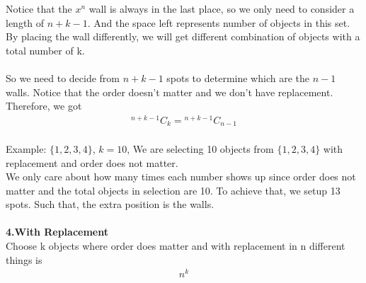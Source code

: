\documentclass[11pt,oneside]{book}
\theoremstyle{break}
\theoremstyle{break}
\newcommand*{\Comb}[2]{{}^{#1}C_{#2}}
\newcommand{\example}{\color{WildStrawberry}Example: \color{black}}
\begin{document}
Notice that the $x^{n}$ wall is always in the last place, so we only need to consider a length of $n+k-1$. And the space left represents number of objects in this set. By placing the wall differently, we will get different combination of objects with a total number of k. \\
\hfill\\
So we need to decide from $n+k-1$ spots to determine which are the $n-1$ walls. Notice that the order doesn't matter and we don't have replacement. Therefore, we got
 \begin{align*}
\Comb{n+k-1}{k}=\Comb{n+k-1}{n-1}
\end{align*}
\hfill\\
\example $\{1,2,3,4\}$, $k=10$, We are selecting 10 objects from $\{1,2,3,4\}$ with replacement and order does not matter.\\
We only care about how many times each number shows up since order does not matter and the total objects in selection are 10. To achieve that, we setup 13 spots. Such that, the extra position is the walls.\\
\hfill\\
\textbf{4.With Replacement}\\
Choose k objects where order does matter and with replacement in n different things is \begin{align*}
n^k
\end{align*}
\end{document}
